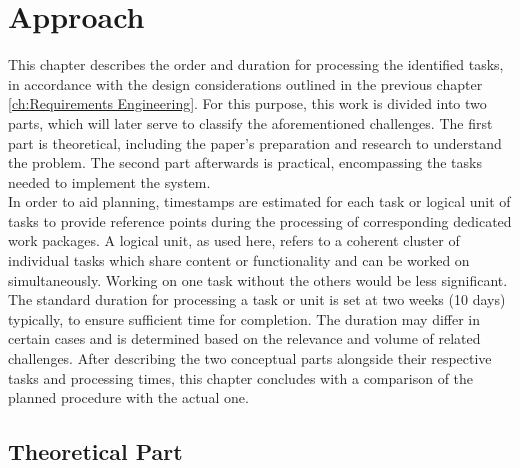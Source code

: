 

\chapter{Approach}
\label{ch:Approach}

This chapter describes the order and duration for processing the identified tasks, in accordance with the design considerations outlined in the previous chapter \ref{ch:Requirements Engineering}. 
For this purpose, this work is divided into two parts, which will later serve to classify the aforementioned challenges.
The first part is theoretical, including the paper's preparation and research to understand the problem. 
The second part afterwards is practical, encompassing the tasks needed to implement the system. \\
\noindent In order to aid planning, timestamps are estimated for each task or logical unit of tasks to provide reference points during the processing of corresponding dedicated work packages. 
A logical unit, as used here, refers to a coherent cluster of individual tasks which share content or functionality and can be worked on simultaneously. Working on one task without the others would be less significant.
The standard duration for processing a task or unit is set at two weeks (10 days) typically, to ensure sufficient time for completion. The duration may differ in certain cases and is determined based on the relevance and volume of related challenges. 
After describing the two conceptual parts alongside their respective tasks and processing times, this chapter concludes with a comparison of the planned procedure with the actual one.

\section{Theoretical Part}
\label{ch:Approach:sec:Theoretical Part}

